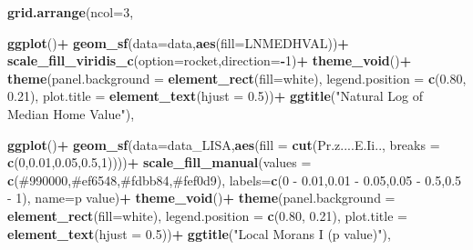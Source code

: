 \documentclass[
]{article}
\newenvironment{Shaded}{\begin{snugshade}}{\end{snugshade}}
\newcommand{\AttributeTok}[1]{\textcolor[rgb]{0.13,0.29,0.53}{#1}}
\newcommand{\DecValTok}[1]{\textcolor[rgb]{0.00,0.00,0.81}{#1}}
\newcommand{\FloatTok}[1]{\textcolor[rgb]{0.00,0.00,0.81}{#1}}
\newcommand{\FunctionTok}[1]{\textcolor[rgb]{0.13,0.29,0.53}{\textbf{#1}}}
\newcommand{\NormalTok}[1]{#1}
\newcommand{\SpecialCharTok}[1]{\textcolor[rgb]{0.81,0.36,0.00}{\textbf{#1}}}
\newcommand{\StringTok}[1]{\textcolor[rgb]{0.31,0.60,0.02}{#1}}
\begin{document}
\begin{Shaded}
\begin{Highlighting}[]
\FunctionTok{grid.arrange}\NormalTok{(}\AttributeTok{ncol=}\DecValTok{3}\NormalTok{,}
             
\FunctionTok{ggplot}\NormalTok{()}\SpecialCharTok{+}
  \FunctionTok{geom\_sf}\NormalTok{(}\AttributeTok{data=}\NormalTok{data,}\FunctionTok{aes}\NormalTok{(}\AttributeTok{fill=}\NormalTok{LNMEDHVAL))}\SpecialCharTok{+}
  \FunctionTok{scale\_fill\_viridis\_c}\NormalTok{(}\AttributeTok{option=}\StringTok{\textquotesingle{}rocket\textquotesingle{}}\NormalTok{,}\AttributeTok{direction=}\SpecialCharTok{{-}}\DecValTok{1}\NormalTok{)}\SpecialCharTok{+}
  \FunctionTok{theme\_void}\NormalTok{()}\SpecialCharTok{+}
  \FunctionTok{theme}\NormalTok{(}\AttributeTok{panel.background =} \FunctionTok{element\_rect}\NormalTok{(}\AttributeTok{fill=}\StringTok{\textquotesingle{}white\textquotesingle{}}\NormalTok{),}
        \AttributeTok{legend.position =} \FunctionTok{c}\NormalTok{(}\FloatTok{0.80}\NormalTok{, }\FloatTok{0.21}\NormalTok{),}
        \AttributeTok{plot.title =} \FunctionTok{element\_text}\NormalTok{(}\AttributeTok{hjust =} \FloatTok{0.5}\NormalTok{))}\SpecialCharTok{+}
  \FunctionTok{ggtitle}\NormalTok{(}\StringTok{"Natural Log of Median Home Value"}\NormalTok{),}

\FunctionTok{ggplot}\NormalTok{()}\SpecialCharTok{+}
  \FunctionTok{geom\_sf}\NormalTok{(}\AttributeTok{data=}\NormalTok{data\_LISA,}\FunctionTok{aes}\NormalTok{(}\AttributeTok{fill =} \FunctionTok{cut}\NormalTok{(Pr.z....E.Ii.., }\AttributeTok{breaks =} \FunctionTok{c}\NormalTok{(}\DecValTok{0}\NormalTok{,}\FloatTok{0.01}\NormalTok{,}\FloatTok{0.05}\NormalTok{,}\FloatTok{0.5}\NormalTok{,}\DecValTok{1}\NormalTok{))))}\SpecialCharTok{+}
  \FunctionTok{scale\_fill\_manual}\NormalTok{(}\AttributeTok{values =} \FunctionTok{c}\NormalTok{(}\StringTok{\textquotesingle{}\#990000\textquotesingle{}}\NormalTok{,}\StringTok{\textquotesingle{}\#ef6548\textquotesingle{}}\NormalTok{,}\StringTok{\textquotesingle{}\#fdbb84\textquotesingle{}}\NormalTok{,}\StringTok{\textquotesingle{}\#fef0d9\textquotesingle{}}\NormalTok{),}
                    \AttributeTok{labels=}\FunctionTok{c}\NormalTok{(}\StringTok{\textquotesingle{}0 {-} 0.01\textquotesingle{}}\NormalTok{,}\StringTok{\textquotesingle{}0.01 {-} 0.05\textquotesingle{}}\NormalTok{,}\StringTok{\textquotesingle{}0.05 {-} 0.5\textquotesingle{}}\NormalTok{,}\StringTok{\textquotesingle{}0.5 {-} 1\textquotesingle{}}\NormalTok{),}
                    \AttributeTok{name=}\StringTok{\textquotesingle{}p value\textquotesingle{}}\NormalTok{)}\SpecialCharTok{+}
  \FunctionTok{theme\_void}\NormalTok{()}\SpecialCharTok{+}
  \FunctionTok{theme}\NormalTok{(}\AttributeTok{panel.background =} \FunctionTok{element\_rect}\NormalTok{(}\AttributeTok{fill=}\StringTok{\textquotesingle{}white\textquotesingle{}}\NormalTok{),}
        \AttributeTok{legend.position =} \FunctionTok{c}\NormalTok{(}\FloatTok{0.80}\NormalTok{, }\FloatTok{0.21}\NormalTok{),}
        \AttributeTok{plot.title =} \FunctionTok{element\_text}\NormalTok{(}\AttributeTok{hjust =} \FloatTok{0.5}\NormalTok{))}\SpecialCharTok{+}
  \FunctionTok{ggtitle}\NormalTok{(}\StringTok{"Local Morans I (p value)"}\NormalTok{),}
             

\end{Highlighting}
\end{Shaded}
\end{document}
